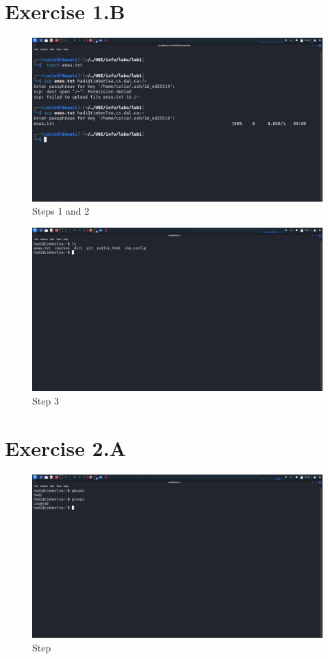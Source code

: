 \documentclass{article}
\numberwithin{equation}{subsection}
\begin{document}
	\newpage
	\section{Exercise 1.B}
	\begin{figure}[H]
		\caption{Steps 1 and 2}
		\includegraphics[width=450pt]{images/e1qB/1.png}
	\end{figure}	

	\begin{figure}[H]
		\caption{Step 3}
		\includegraphics[width=450pt]{images/e1qB/2.png}
	\end{figure}	


	\newpage
	\section{Exercise 2.A}
	\begin{figure}[H]
		\caption{Step}
		\includegraphics[width=450pt]{images/e2qA/1.png}
	\end{figure}	
	
\end{document}
